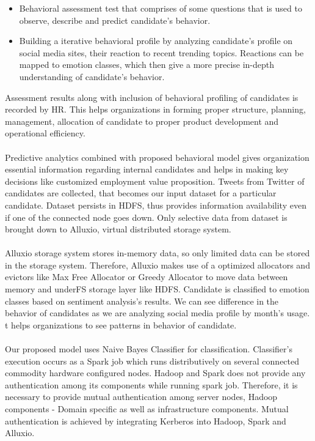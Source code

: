 \documentclass[oneside,a4paper,12pt]{pictreport}
\begin{document}
\begin{itemize}
\item Behavioral assessment test that comprises of some questions that is used to observe, describe and predict candidate’s behavior.
\item Building a iterative behavioral profile by analyzing candidate’s profile on social media sites, their reaction to recent trending topics. Reactions can be mapped to emotion classes, which then give a more precise in-depth understanding of candidate’s behavior.
\end{itemize}
Assessment results along with inclusion of behavioral profiling of candidates is recorded by HR. This helps organizations in forming proper structure, planning, management, allocation of candidate to proper product development and operational efficiency.\\\\
Predictive analytics combined with proposed behavioral model gives organization essential information regarding internal candidates and helps in making key decisions like customized employment value proposition. Tweets from Twitter of candidates are collected, that becomes our input dataset for a particular candidate. Dataset persists in HDFS, thus provides information availability even if one of the connected node goes down. Only selective data from dataset is brought down to Alluxio, virtual distributed storage system. \\\\
Alluxio storage system stores in-memory data, so only limited data can be stored in the storage system. Therefore, Alluxio makes use of a optimized allocators and evictors like Max Free Allocator or Greedy Allocator to move data between memory and underFS storage layer like HDFS. Candidate is classified to emotion classes based on sentiment analysis’s results. We can see difference in the behavior of candidates as we are analyzing social media profile by month’s usage. t helps organizations to see patterns in behavior of candidate.\\\\
Our proposed model uses Naive Bayes Classifier for classification. Classifier's execution occurs as a Spark job which runs distributively on several connected commodity hardware configured nodes. Hadoop and Spark does not provide any authentication among its components while running spark job. Therefore, it is necessary to provide mutual authentication among server nodes, Hadoop components - Domain specific as well as infrastructure components. Mutual authentication is achieved by integrating Kerberos into Hadoop, Spark and Alluxio.
\end{document}
